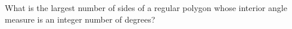 What is the largest number of sides of a regular polygon whose interior angle measure is an integer number of degrees?
